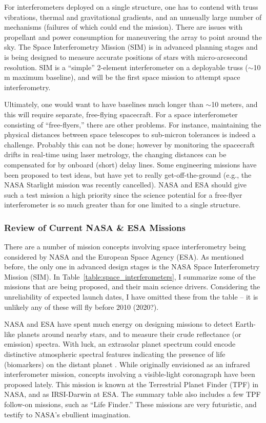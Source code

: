 \documentclass[12pt]{iopart}
\begin{document}
For interferometers deployed on a single structure, one has to contend
with truss vibrations, thermal and gravitational gradients, and an
unusually large number of mechanisms (failures of which could end the
mission).  There are issues with propellant and power consumption for
maneuvering the array to point around the sky.  The Space
Interferometry Mission (SIM) is in advanced planning stages and is
being designed to measure accurate positions of stars with
micro-arcsecond resolution.  SIM is a ``simple'' 2-element
interferometer on a deployable truss ($\sim$10\,m maximum baseline),
and will be the first space mission to attempt space interferometry.

Ultimately, one would want to have baselines much longer than $\sim$10
meters, and this will require separate, free-flying spacecraft.  For a
space interferometer consisting of ``free-flyers,'' there are other
problems.  For instance, maintaining the physical distances between
space telescopes to sub-micron tolerances is indeed a challenge.
Probably this can not be done; however by monitoring the spacecraft
drifts in real-time using laser metrology, the changing distances can
be compensated for by onboard (short) delay lines.  Some engineering
missions have been proposed to test ideas, but have yet to really
get-off-the-ground (e.g., the NASA Starlight mission was recently
cancelled).  NASA and ESA should give such a test mission a high
priority since the science potential for a free-flyer interferometer
is so much greater than for one limited to a single structure.


\subsubsection{Review of Current NASA \& ESA Missions}
There are a number of mission concepts involving space interferometry
being considered by NASA and the European Space Agency (ESA). As
mentioned before, the only one in advanced design stages is the NASA
Space Interferometry Mission (SIM).  In
Table~\ref{table:space_interferometers}, I summarize some of the
missions that are being proposed, and their main science drivers.
Considering the unreliability of expected launch dates, I have omitted
these from the table -- it is unlikely any of these will fly before 2010 (2020?).

NASA and ESA have spent much energy on designing missions to detect
Earth-like planets around nearby stars, and to measure their crude
reflectance (or emission) spectra.  With luck, an extrasolar planet
spectrum could encode distinctive atmospheric spectral features
indicating the presence of life (biomarkers) on the distant planet
\citep[e.g.,][]{woolf2002}.  While originally envisioned as an
infrared interferometer mission, concepts involving a visible-light
coronagraph have been proposed lately. This mission is known at the
Terrestrial Planet Finder (TPF) in NASA, and as IRSI-Darwin at ESA.
The summary table also includes a few TPF follow-on missions, such as
``Life Finder.''  These missions are very futuristic, and testify to
NASA's ebullient imagination.
\end{document}
